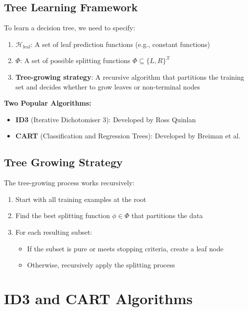 \documentclass[11pt,a4paper]{article}
\theoremstyle{definition}
\theoremstyle{plain}
\theoremstyle{remark}
\begin{document}
\subsection{Tree Learning Framework}

To learn a decision tree, we need to specify:

\begin{enumerate}
    \item \textbf{\(\mathcal{H}_{\text{leaf}}\)}: A set of leaf prediction functions (e.g., constant functions)
    \item \textbf{\(\Phi\)}: A set of possible splitting functions \(\Phi \subseteq \{L, R\}^{\mathcal{X}}\)
    \item \textbf{Tree-growing strategy}: A recursive algorithm that partitions the training set and decides whether to grow leaves or non-terminal nodes
\end{enumerate}

\textbf{Two Popular Algorithms:}
\begin{itemize}
    \item \textbf{ID3} (Iterative Dichotomiser 3): Developed by Ross Quinlan
    \item \textbf{CART} (Classification and Regression Trees): Developed by Breiman et al.
\end{itemize}

\subsection{Tree Growing Strategy}

The tree-growing process works recursively:

\begin{enumerate}
    \item Start with all training examples at the root
    \item Find the best splitting function \(\phi \in \Phi\) that partitions the data
    \item For each resulting subset:
    \begin{itemize}
        \item If the subset is pure or meets stopping criteria, create a leaf node
        \item Otherwise, recursively apply the splitting process
    \end{itemize}
\end{enumerate}

\section{ID3 and CART Algorithms}
\end{document}
